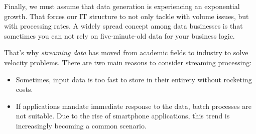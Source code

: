 Finally, we must assume that data generation is experiencing an exponential growth. That forces our IT structure to not only tackle with volume issues, but with processing rates. A widely spread concept among data businesses is that sometimes you can not rely on five-minute-old data for your business logic.

That's why \textit{streaming data} has moved from academic fields to industry to solve velocity problems. There are two main reasons to consider streaming processing:
\begin{itemize}
	\item Sometimes, input data is too fast to store in their entirety without rocketing costs.
	\item If applications mandate immediate response to the data, batch processes are not suitable. Due to the rise of smartphone applications, this trend is increasingly becoming a common scenario.
\end{itemize}
